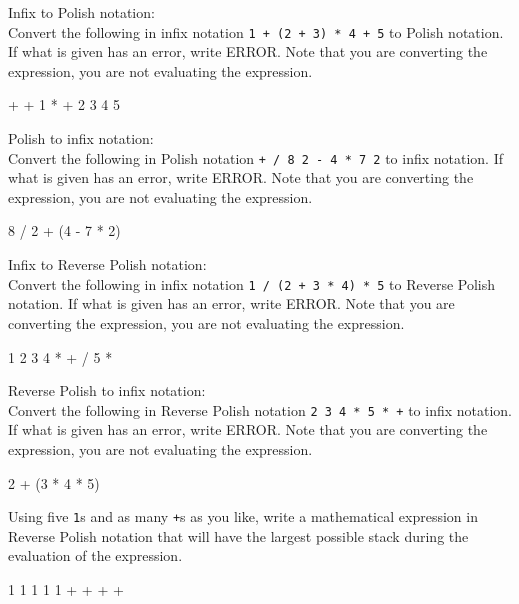 

\nextq
Infix to Polish notation:
\\
Convert the following in infix notation \verb!1 + (2 + 3) * 4 + 5! to
Polish notation.
If what is given has an error, write ERROR.
Note that you are converting the expression, you are not
evaluating the expression.
\\
\ANSWER
\begin{answercode}
+ + 1 * + 2 3 4 5
\end{answercode}

\nextq
Polish to infix notation:
\\
Convert the following in Polish notation \verb!+ / 8 2 - 4 * 7 2!
to infix notation.
If what is given has an error, write ERROR.
Note that you are converting the expression, you are not
evaluating the expression.
\\
\ANSWER
\begin{answercode}
8 / 2 + (4 - 7 * 2)
\end{answercode}

\nextq
Infix to Reverse Polish notation:
\\
Convert the following in infix notation \verb!1 / (2 + 3 * 4) * 5! to
Reverse Polish notation.
If what is given has an error, write ERROR.
Note that you are converting the expression, you are not
evaluating the expression.
\\
\ANSWER
\begin{answercode}
1 2 3 4 * + / 5 *
\end{answercode}

\nextq
Reverse Polish to infix notation:
\\
Convert the following in Reverse Polish notation \verb!2 3 4 * 5 * +!
to infix notation.
If what is given has an error, write ERROR.
Note that you are converting the expression, you are not
evaluating the expression.
\\
\ANSWER
\begin{answercode}
2 + (3 * 4 * 5)
\end{answercode}

\nextq
Using five \verb!1!s and as many \verb!+!s as you like,
write a mathematical expression in Reverse Polish notation
that will have the largest possible
stack during the evaluation of the expression.
\\
\ANSWER
\begin{answercode}
1 1 1 1 1 + + + +
\end{answercode}

